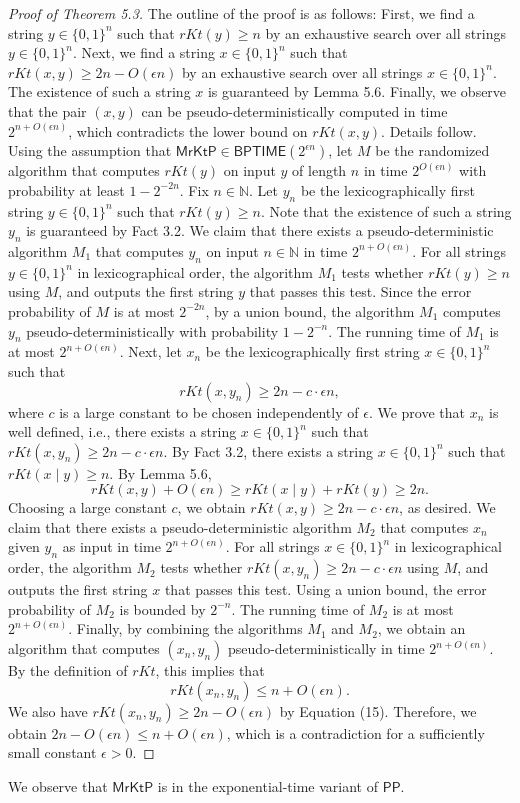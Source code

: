 \documentclass[10pt,a4paper]{article}
\begin{document}
\begin{proof}[Proof of Theorem 5.3]
The outline of the proof is as follows: First, we find a string $y\in\{0,1\}^n$ such that $rKt(y)\geq n$ by an exhaustive search over all strings $y\in\{0,1\}^n$. Next, we find a string $x\in\{0,1\}^n$ such that $rKt(x,y)\geq2n-O(\epsilon n)$ by an exhaustive search over all strings $x\in\{0,1\}^n$. The existence of such a string $x$ is guaranteed by Lemma 5.6. Finally, we observe that the pair $(x,y)$ can be pseudo-deterministically computed in time $2^{n+O(\epsilon n)}$, which contradicts the lower bound on $rKt(x,y)$. Details follow.
Using the assumption that $\mathsf{MrKtP}\in\mathsf{BPTIME}(2^{\epsilon n})$, let $M$ be the randomized algorithm that computes $rKt(y)$ on input $y$ of length $n$ in time $2^{O(\epsilon n)}$ with probability at least $1-2^{-2n}$. Fix $n\in\mathbb N$. Let $y_n$ be the lexicographically first string $y\in\{0,1\}^n$ such that $rKt(y)\geq n$. Note that the existence of such a string $y_n$ is guaranteed by Fact 3.2.
We claim that there exists a pseudo-deterministic algorithm $M_1$ that computes $y_n$ on input $n\in\mathbb N$ in time $2^{n+O(\epsilon n)}$. For all strings $y\in\{0,1\}^n$ in lexicographical order, the algorithm $M_1$ tests whether $rKt(y)\geq n$ using $M$, and outputs the first string $y$ that passes this test. Since the error probability of $M$ is at most $2^{-2n}$, by a union bound, the algorithm $M_1$ computes $y_n$ pseudo-deterministically with probability $1-2^{-n}$. The running time of $M_1$ is at most $2^{n+O(\epsilon n)}$.
Next, let $x_n$ be the lexicographically first string $x\in\{0,1\}^n$ such that
\[rKt(x,y_n)\geq2n-c\cdot\epsilon n,\tag{15}\]
where $c$ is a large constant to be chosen independently of $\epsilon$. We prove that $x_n$ is well defined, i.e., there exists a string $x\in\{0,1\}^n$ such that $rKt(x,y_n)\geq2n-c\cdot\epsilon n$. By Fact 3.2, there exists a string $x\in\{0,1\}^n$ such that $rKt(x\mid y)\geq n$. By Lemma 5.6,
\[rKt(x,y)+O(\epsilon n)\geq rKt(x\mid y)+rKt(y)\geq2n.\]
Choosing a large constant $c$, we obtain $rKt(x,y)\geq2n-c\cdot\epsilon n$, as desired.
We claim that there exists a pseudo-deterministic algorithm $M_2$ that computes $x_n$ given $y_n$ as input in time $2^{n+O(\epsilon n)}$. For all strings $x\in\{0,1\}^n$ in lexicographical order, the algorithm $M_2$ tests whether $rKt(x,y_n)\geq2n-c\cdot\epsilon n$ using $M$, and outputs the first string $x$ that passes this test. Using a union bound, the error probability of $M_2$ is bounded by $2^{-n}$. The running time of $M_2$ is at most $2^{n+O(\epsilon n)}$.
Finally, by combining the algorithms $M_1$ and $M_2$, we obtain an algorithm that computes $(x_n,y_n)$ pseudo-deterministically in time $2^{n+O(\epsilon n)}$. By the definition of $rKt$, this implies that
\[rKt(x_n,y_n)\leq n+O(\epsilon n).\]
We also have $rKt(x_n,y_n)\geq2n-O(\epsilon n)$ by Equation (15). Therefore, we obtain $2n-O(\epsilon n)\leq n+O(\epsilon n)$, which is a contradiction for a sufficiently small constant $\epsilon>0$.
\end{proof}
We observe that $\mathsf{MrKtP}$ is in the exponential-time variant of $\mathsf{PP}$.
\end{document}
